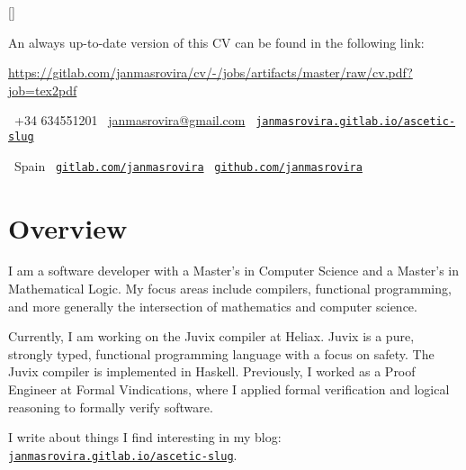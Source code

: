 \documentclass[11pt]{article}
\begin{document}
\par{\bigskip\par}
\titleformat{\section}{\Large\scshape\raggedright}{}{0em}{}[\titlerule]

An always up-to-date version of this CV can be found in the following link:
\begin{center}
\url{https://gitlab.com/janmasrovira/cv/-/jobs/artifacts/master/raw/cv.pdf?job=tex2pdf}
\end{center}

\vspace{0.4cm}

\begin{center}
    \hfill
    \faPhone\ +34 634551201
    \hfill
    \faEnvelope\ \href{mailto:janmasrovira@gmail.com}{janmasrovira@gmail.com}
    \hfill
    \faGlobe\ \href{https://janmasrovira.gitlab.io/ascetic-slug/}{\texttt{janmasrovira.gitlab.io/ascetic-slug}}
    \hspace*{\fill}
    \\
    \vspace{0.1cm}

    \hfill
    \faMapMarker\ Spain
    \hfill
    \faGitlab\ \href{https://gitlab.com/janmasrovira}{\texttt{gitlab.com/janmasrovira}}
    \hfill
    \faGithub\ \href{https://github.com/janmasrovira}{\texttt{github.com/janmasrovira}}
    \hspace*{\fill}
\end{center}

\section{Overview}

I am a software developer with a Master's in Computer Science and a Master's in
Mathematical Logic. My focus areas include compilers, functional programming,
and more generally the intersection of mathematics and computer science.

Currently, I am working on the Juvix compiler at Heliax. Juvix is a pure,
strongly typed, functional programming language with a focus on safety. The Juvix compiler is implemented in Haskell.
Previously, I worked as a Proof Engineer at Formal Vindications, where I applied
formal verification and logical reasoning to formally verify software.

I write about things I find interesting in my blog: \href{https://janmasrovira.gitlab.io/ascetic-slug/}{\texttt{janmasrovira.gitlab.io/ascetic-slug}}.
\end{document}
